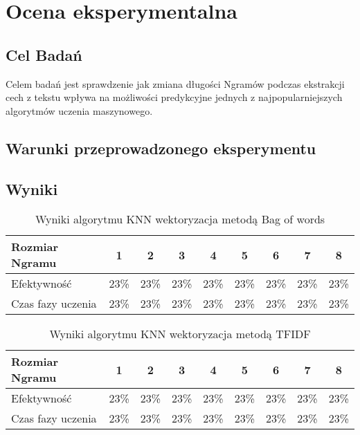 \chapter{Ocena eksperymentalna}

\section{Cel Badań}
Celem badań jest sprawdzenie jak zmiana długości Ngramów podczas ekstrakcji cech
z tekstu wpływa na możliwości predykcyjne jednych z najpopularniejszych algorytmów 
uczenia maszynowego. 
\section{Warunki przeprowadzonego eksperymentu}

\section{Wyniki}

\begin{table}[h!]
    \centering
    \begin{tabular}{ | l | c | c | c | c | c | c | c | c |}
        \hline
        Rozmiar Ngramu & 1 & 2 & 3 & 4 & 5 & 6 & 7 & 8  \\ \hline
        Efektywność & 23\% & 23\% & 23\% & 23\% & 23\% & 23\% & 23\% & 23\%   \\ \hline
        Czas fazy uczenia & 23\% & 23\% & 23\% & 23\% & 23\% & 23\% & 23\% & 23\%  \\ \hline
    \end{tabular}
    \caption{Wyniki algorytmu KNN wektoryzacja metodą Bag of words}
\end{table}

\begin{table}[h!]
    \centering
    \begin{tabular}{ | l | c | c | c | c | c | c | c | c |}
        \hline
        Rozmiar Ngramu & 1 & 2 & 3 & 4 & 5 & 6 & 7 & 8  \\ \hline
        Efektywność & 23\% & 23\% & 23\% & 23\% & 23\% & 23\% & 23\% & 23\%   \\ \hline
        Czas fazy uczenia & 23\% & 23\% & 23\% & 23\% & 23\% & 23\% & 23\% & 23\%  \\ \hline
    \end{tabular}
    \caption{Wyniki algorytmu KNN wektoryzacja metodą TFIDF}
\end{table}

